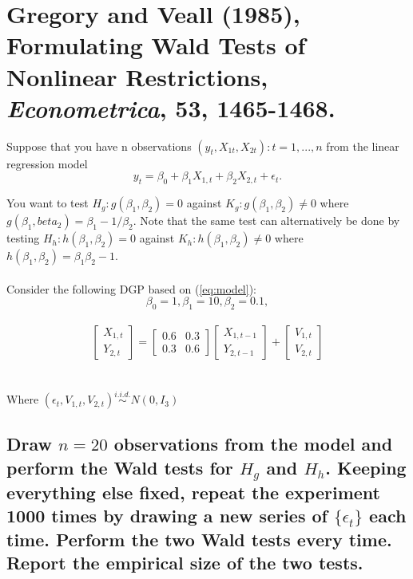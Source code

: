 \documentclass[11pt]{article}
\theoremstyle{definition}
\begin{document}
\section{Gregory and Veall (1985), Formulating Wald Tests of Nonlinear Restrictions, \textit{Econometrica}, 53, 1465-1468. }

Suppose that you have n observations ${(y_t, X_{1t}, X_{2t}) : t = 1, ..., n}$ from the linear regression model\
\begin{equation}
y_t = \beta_0 + \beta_1X_{1,t} + \beta_2X_{2,t} + \epsilon_t.
\label{eq:model}
\end{equation}

\noindent
You want to test $H_g : g(\beta_1, \beta_2) = 0$ against $K_g : g(\beta_1, \beta_2) \ne 0$ where $g(\beta_1, beta_2) = \beta_1 - 1/\beta_2$. Note that the same test can alternatively be done by testing $H_h :h(\beta_1, \beta_2) = 0$ against $K_h : h(\beta_1, \beta_2) \ne 0$ where $h(\beta_1, \beta_2) = \beta_1\beta_2-1$.\\
\\
\newpage
Consider the following DGP based on (\ref{eq:model}):\\
$$\beta_0 = 1, \beta_1 = 10, \beta_2 = 0.1,$$\\

\[
  \begin{bmatrix} X_{1,t} \\ Y_{2,t} \end{bmatrix} 
	= 
  \begin{bmatrix} 0.6 & 0.3 \\ 0.3 & 0.6 \end{bmatrix} 
  \begin{bmatrix}  X_{1,t-1} \\ Y_{2,t-1} \end{bmatrix}
  	+
  \begin{bmatrix}  V_{1,t} \\ V_{2,t} \end{bmatrix}
\]\\
\\
Where $(\epsilon_t, V_{1,t}, V_{2,t}) \overset{i.i.d.}{\sim} N(0, I_3) $ 

\subsection{Draw $n=20$ observations from the model and perform the Wald tests for $H_{g}$ and $H_{h}$.  Keeping everything else fixed, repeat the experiment 1000 times by drawing a new series of $\{\epsilon_{t}\}$ each time.  Perform the two Wald tests every time.  Report the empirical size of the two tests.}
\end{document}
